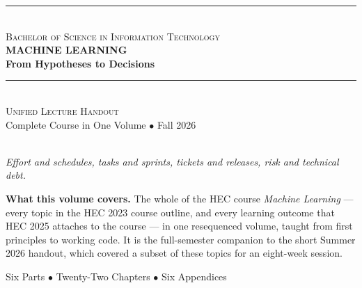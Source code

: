 \thispagestyle{empty}

\begin{center}
\vspace*{1.0cm}

{\color{secondary}\rule{0.85\textwidth}{2pt}}\\[6pt]
{\large\textsc{\color{secondary}Bachelor of Science in Information Technology}}\\[18pt]

{\Huge\bfseries\color{primary}MACHINE LEARNING}\\[10pt]
{\LARGE\bfseries\color{primary}From Hypotheses to Decisions}\\[16pt]

{\color{secondary}\rule{0.85\textwidth}{2pt}}\\[16pt]

{\Large\textsc{Unified Lecture Handout}}\\[6pt]
{\large\color{gray!70!black}Complete Course in One Volume $\bullet$ Fall 2026}\\[24pt]

\\[10pt]
{\small\itshape\color{gray!70!black}Effort and schedules, tasks and sprints, tickets and
releases, risk and technical debt.}

\vspace{1.2cm}

\begin{tcolorbox}[enhanced, width=0.86\textwidth, colback=lightbg,
  colframe=primary, boxrule=0pt, leftrule=4pt, arc=2pt, top=6pt, bottom=6pt]
\small
\textbf{\color{primary}What this volume covers.} The whole of the HEC course
\emph{Machine Learning} --- every topic in the HEC 2023 course outline, and every
learning outcome that HEC 2025 attaches to the course --- in one resequenced
volume, taught from first principles to working code. It is the full-semester
companion to the short Summer 2026 handout, which covered a subset of these
topics for an eight-week session.
\end{tcolorbox}

\vspace{1.0cm}
{\small\color{gray!60!black}Six Parts $\bullet$ Twenty-Two Chapters $\bullet$ Six Appendices}
\vspace{1cm}
\end{center}

